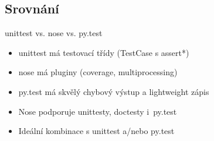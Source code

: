 \subsection{Srovnání}

\begin{frame}
\begin{center}
\huge{unittest vs. nose vs. py.test}
\end{center}
\end{frame}

\begin{frame}
\begin{itemize}[<+->]
\item unittest má testovací třídy (TestCase s assert*)
\item nose má pluginy (coverage, multiprocessing)
\item py.test má skvělý chybový výstup a lightweight zápis
\end{itemize}
\end{frame}

\begin{frame}
\begin{itemize}[<+->]
\item Nose podporuje unittesty, doctesty i~py.test
\item Ideální kombinace s unittest a/nebo py.test
\end{itemize}
\end{frame}